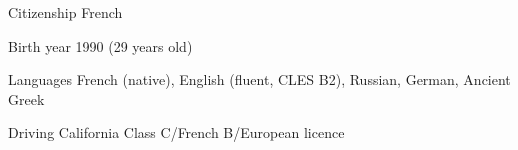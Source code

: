 
\begin{cvskills}

	\cvskill
	{Citizenship}
    {French}

	\cvskill
	{Birth year}
    {1990 (29 years old)}

	\cvskill
	{Languages}
    {French (native), English (fluent, CLES B2), Russian, German, Ancient Greek}

	\cvskill
	{Driving}
    {California Class C/French B/European licence}

\end{cvskills}

